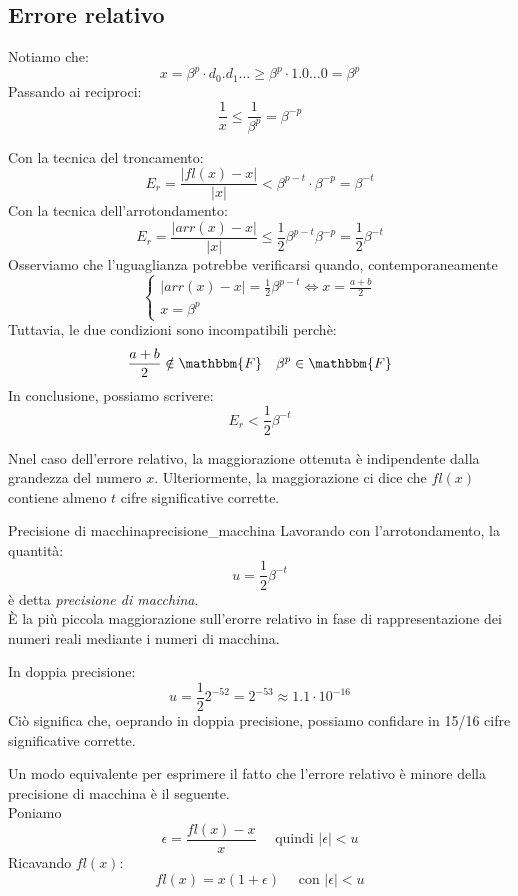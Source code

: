 \documentclass[12pt]{report}
\newcounter{definition}
\newcommand{\nmu}{}
\begin{document}
\subsection{Errore relativo}
\begin{note}{}{}
	Notiamo che:
	\[
	x = \beta^p\cdot d_0.d_1\dots \geq \beta^p \cdot 1. 0\dots0 = \beta^p
	\]
	Passando ai reciproci:
	\[
	\frac{1}{x} \leq \frac{1}{\beta^p} = \beta^{-p}
	\]
\end{note}
Con la tecnica del troncamento:
\[
E_r = \frac{|fl(x) - x|}{|x|} < \beta^{p-t}\cdot \beta^{-p} = \beta^{-t}
\]
Con la tecnica dell'arrotondamento:
\[
E_r = \frac{|arr(x) - x|}{|x|} \leq \frac{1}{2}\beta^{p-t}\beta^{-p} = \frac{1}{2}\beta^{-t}
\]
Osserviamo che l'uguaglianza potrebbe verificarsi quando, contemporaneamente
\[
\begin{cases}
	|arr(x) - x| = \frac{1}{2}\beta^{p-t} \iff x = \frac{a+b}{2} \\
	x = \beta^p
\end{cases}
\]
Tuttavia, le due condizioni sono incompatibili perchè:
\[
\frac{a+b}{2} \notin \mathbbm{F} \quad \beta^p \in \mathbbm{F}
\]
In conclusione, possiamo scrivere:
\[
E_r < \frac{1}{2}\beta^{-t}
\]
\begin{note}{}{}
	Nnel caso dell'errore relativo, la maggiorazione ottenuta è indipendente dalla grandezza del numero $x$. Ulteriormente, la maggiorazione ci dice che $fl(x)$ contiene almeno $t$ cifre significative corrette.
\end{note}
\begin{definition}{\nmu Precisione di macchina}{precisione_macchina}
	Lavorando con l'arrotondamento, la quantità:
	\[
	u = \frac{1}{2}\beta^{-t}
	\]
	è detta \textit{precisione di macchina}. \\

	È la più piccola maggiorazione sull'erorre relativo in fase di rappresentazione dei numeri reali mediante i numeri di macchina.
\end{definition}
In doppia precisione:
\[
u = \frac{1}{2}2^{-52} = 2^{-53} \approx 1.1 \cdot 10^{-16}
\]
Ciò significa che, oeprando in doppia precisione, possiamo confidare in 15/16 cifre significative corrette.
\begin{note}{}{}
	Un modo equivalente per esprimere il fatto che l'errore relativo è minore della precisione di macchina è il seguente. \\
	Poniamo
	\[
	\epsilon = \frac{fl(x) - x}{x} \quad \text{ quindi } |\epsilon| < u
	\]
	Ricavando $fl(x)$:
	\[
	fl(x) = x(1 + \epsilon) \quad \text{ con } |\epsilon| < u
	\]
\end{note}
\end{document}
